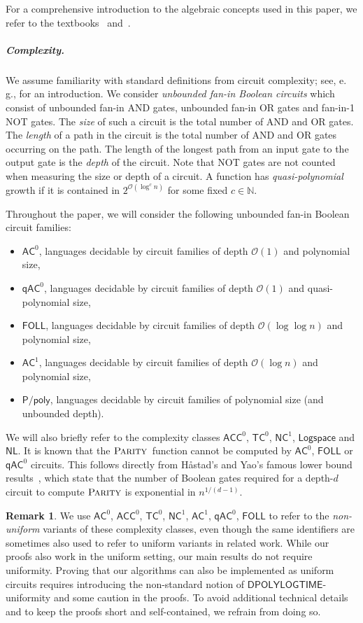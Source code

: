 \documentclass[11pt]{article}
\numberwithin{equation}{section}
\theoremstyle{definition}
\newtheorem{remark}[theorem]{Remark}
\theoremstyle{plain}
\newcommand{\N}{\mathbb N}
\newcommand{\eg}{e.\,g.}
\newcommand{\bigO}{\mathcal{O}}
\newcommand{\FOLL}{\ensuremath{\mathsf{FOLL}}}
\newcommand{\AC}{\ensuremath{\mathsf{AC}}}
\newcommand{\ACC}{\ensuremath{\mathsf{ACC}}}
\newcommand{\qAC}{\ensuremath{\mathsf{qAC}}}
\newcommand{\TC}{\ensuremath{\mathsf{TC}}}
\newcommand{\NC}{\ensuremath{\mathsf{NC}}}
\newcommand{\LOGSPACE}{\ensuremath{\mathsf{Logspace}}}
\newcommand{\NL}{\ensuremath{\mathsf{NL}}}
\newcommand{\Ppoly}{\ensuremath{\mathsf{P / poly}}}
\newcommand{\DPOLYLOGTIME}{\ensuremath{\mathsf{DPOLYLOGTIME}}}
\newcommand{\Parity}{\ensuremath{\textsc{Parity}}}
\begin{document}
For a comprehensive introduction to the algebraic concepts used in this paper,
we refer to the textbooks~\cite{Howie95} and~\cite{pin86}.

\subparagraph{Complexity.}

We assume familiarity with standard definitions from circuit complexity;
see, \eg, %
\cite{Vollmer99} for an introduction.
%
We consider \emph{unbounded fan-in Boolean circuits} which consist of unbounded
fan-in AND gates, unbounded fan-in OR gates and fan-in-1 NOT gates.
%
The \emph{size} of such a circuit is the total number of AND and OR gates.
%
The \emph{length} of a path in the circuit is the total number of AND and OR
gates occurring on the path.
%
The length of the longest path from an input gate to the output gate is the
\emph{depth} of the circuit.
%
Note that NOT gates are not counted when measuring the size or depth of a
circuit.
%
A function has \emph{quasi-polynomial} growth if it is contained in
$2^{\bigO(\log^c n)}$ for some fixed $c \in \N$.

Throughout the paper, we will consider the following unbounded fan-in Boolean
circuit families:
%
\begin{itemize}
  \item $\AC^0$, languages decidable by circuit families of depth $\bigO(1)$
    and polynomial size,
  \item $\qAC^0$, languages decidable by circuit families of depth $\bigO(1)$
    and quasi-polynomial size,
  \item $\FOLL$, languages decidable by circuit families of depth
    $\bigO(\log \log n)$ and polynomial size,
  \item $\AC^1$, languages decidable by circuit families of depth
    $\bigO(\log n)$ and polynomial size,
  \item $\Ppoly$, languages decidable by circuit families of polynomial size
    (and unbounded depth).
\end{itemize}

We will also briefly refer to the complexity classes $\ACC^0$, $\TC^0$,
$\NC^1$, $\LOGSPACE$ and $\NL$.
%
It is known that the \Parity~function cannot be computed by $\AC^0$, $\FOLL$ or
$\qAC^0$ circuits. This follows directly from H{\aa}stad's and Yao's famous
lower bound results~\cite{Hastad86,Yao85}, which state that the number of
Boolean gates required for a depth-$d$ circuit to compute $\Parity$ is
exponential in $n^{1/(d-1)}$.

\begin{remark}
  We use $\AC^0$, $\ACC^0$, $\TC^0$, $\NC^1$, $\AC^1$, $\qAC^0$, $\FOLL$ to
  refer to the \emph{non-uniform} variants of these complexity classes, even
  though the same identifiers are sometimes also used to refer to uniform
  variants in related work.
  While our proofs also work in the uniform setting, our main results do not
  require uniformity.
  Proving that our algorithms can also be implemented as uniform circuits
  requires introducing the non-standard notion of $\DPOLYLOGTIME$-uniformity
  and some caution in the proofs. To avoid additional technical details and to
  keep the proofs short and self-contained, we refrain from doing so.
  \label{}
\end{remark}
\end{document}
